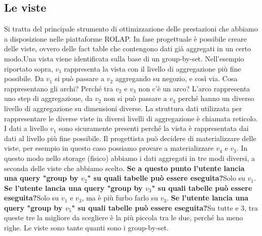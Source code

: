 \subsection{Le viste}
Si tratta del principale strumento di ottimizzazione delle prestazioni che abbiamo a disposizione nelle piattaforme ROLAP.\newline
In fase progettuale è possibile creare delle viste, ovvero delle fact table che contengono dati già aggregati in un certo modo.\newline Una vista viene identificata sulla base di un group-by-set.
\noindent Nell'esempio riportato sopra, $v_1$ rappresenta la vista con il livello di aggregazione più fine possibile. Da $v_1$ si può passare a $v_2$ aggregando su negozio, e così via. Cosa rappresentano gli archi? Perché tra $v_2$ e $v_3$ non c'è un arco?\newline
L'arco rappresenta uno step di aggregazione, da $v_2$ non si può passare a $v_3$ perché hanno un diverso livello di aggregazione su dimensioni diverse. La struttura dati utilizzata per rappresentare le diverse viste in diversi livelli di aggregazione è chiamata reticolo.\newline\newline
I dati a livello $v_1$ sono sicuramente presenti perché la vista è rappresentata dai dati al livello più fine possibile. Il progettista può decidere di materializzare delle viste, per esempio in questo caso possiamo provare a materializzare $v_4$ e $v_3$.\newline
In questo modo nello storage (fisico) abbiamo i dati aggregati in tre modi diversi, a seconda delle viste che abbiamo scelto.\newline\newline
\textbf{Se a questo punto l'utente lancia una query "group by $v_2$" su quali tabelle può essere eseguita?}\newline Solo su $v_1$.
\textbf{Se l'utente lancia una query "group by $v_3$" su quali tabelle può essere eseguita?}\newline Solo su $v_1$ e $v_3$, ma è più furbo farlo su $v_3$.
\textbf{Se l'utente lancia una query "group by $v_5$" su quali tabelle può essere eseguita?}\newline Su tutte e 3, tra queste tre la migliore da scegliere è la più piccola tra le due, perché ha meno righe.\newline\newline
Le viste sono tante quanti sono i group-by-set.
